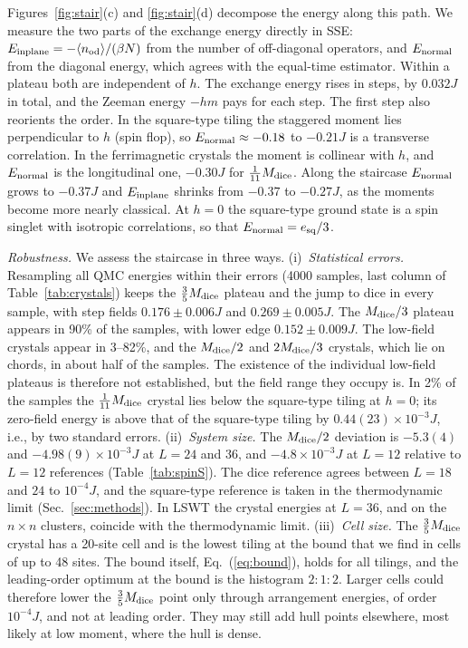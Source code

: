 \documentclass[prb,twocolumn,amsmath,amssymb,floatfix]{revtex4-2}
\newcommand{\Md}{M_{\rm dice}}
\begin{document}
Figures~\ref{fig:stair}(c) and \ref{fig:stair}(d) decompose the energy along this path. We measure the two parts of the exchange energy directly in SSE: $E_{\rm inplane}=-\langle n_{\rm od}\rangle/(\beta N)$ from the number of off-diagonal operators, and $E_{\rm normal}$ from the diagonal energy, which agrees with the equal-time estimator. Within a plateau both are independent of $h$. The exchange energy rises in steps, by $0.032J$ in total, and the Zeeman energy $-hm$ pays for each step. The first step also reorients the order. In the square-type tiling the staggered moment lies perpendicular to $h$ (spin flop), so $E_{\rm normal}\approx-0.18$ to $-0.21J$ is a transverse correlation. In the ferrimagnetic crystals the moment is collinear with $h$, and $E_{\rm normal}$ is the longitudinal one, $-0.30J$ for $\frac1{11}\Md$. Along the staircase $E_{\rm normal}$ grows to $-0.37J$ and $E_{\rm inplane}$ shrinks from $-0.37$ to $-0.27J$, as the moments become more nearly classical. At $h=0$ the square-type ground state is a spin singlet with isotropic correlations, so that $E_{\rm normal}=e_{\rm sq}/3$.

\emph{Robustness.} We assess the staircase in three ways. (i)~\emph{Statistical errors.} Resampling all QMC energies within their errors (4000 samples, last column of Table~\ref{tab:crystals}) keeps the $\frac35\Md$ plateau and the jump to dice in every sample, with step fields $0.176\pm0.006J$ and $0.269\pm0.005J$. The $\Md/3$ plateau appears in 90\% of the samples, with lower edge $0.152\pm0.009J$. The low-field crystals appear in 3--82\%, and the $\Md/2$ and $2\Md/3$ crystals, which lie on chords, in about half of the samples. The existence of the individual low-field plateaus is therefore not established, but the field range they occupy is. In 2\% of the samples the $\frac1{11}\Md$ crystal lies below the square-type tiling at $h=0$; its zero-field energy is above that of the square-type tiling by $0.44(23)\times10^{-3}J$, i.e., by two standard errors. (ii)~\emph{System size.} The $\Md/2$ deviation is $-5.3(4)$ and $-4.98(9)\times10^{-3}J$ at $L=24$ and $36$, and $-4.8\times10^{-3}J$ at $L=12$ relative to $L=12$ references (Table~\ref{tab:spinS}). The dice reference agrees between $L=18$ and $24$ to $10^{-4}J$, and the square-type reference is taken in the thermodynamic limit (Sec.~\ref{sec:methods}). In LSWT the crystal energies at $L=36$, and on the $n\times n$ clusters, coincide with the thermodynamic limit. (iii)~\emph{Cell size.} The $\frac35\Md$ crystal has a 20-site cell and is the lowest tiling at the bound that we find in cells of up to 48 sites. The bound itself, Eq.~(\ref{eq:bound}), holds for all tilings, and the leading-order optimum at the bound is the histogram $2{:}1{:}2$. Larger cells could therefore lower the $\frac35\Md$ point only through arrangement energies, of order $10^{-4}J$, and not at leading order. They may still add hull points elsewhere, most likely at low moment, where the hull is dense.
\end{document}
